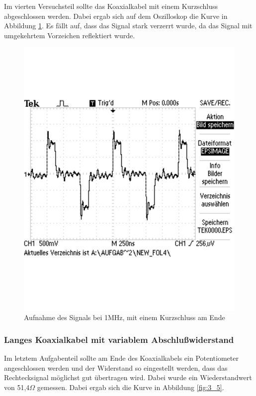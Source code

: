 \documentclass[12pt,a4paper]{article}
\begin{document}
Im vierten Versuchsteil sollte das Koaxialkabel mit einem Kurzschluss abgeschlossen werden. Dabei ergab sich auf dem Oszilloskop die Kurve in Abbildung \ref{fig:3_4}. Es fällt auf, dass das Signal stark verzerrt wurde, da das Signal mit umgekehrtem Vorzeichen reflektiert wurde.

\begin{figure}[H] 
  \centering
    \includegraphics[scale = 0.5]{3_4.pdf}
  	\caption[Aufnahme des Signals bei 1MHz, mit einem Kurzschluss am Ende]{Aufnahme des Signals bei 1MHz, mit einem Kurzschluss am Ende}
  \label{fig:3_4}
\end{figure}

\subsubsection{Langes Koaxialkabel mit variablem Abschlußwiderstand}

Im letztem Aufgabenteil sollte am Ende des Koaxialkabels ein Potentiometer angeschlossen werden und der Widerstand so eingestellt werden, dass das Rechtecksignal möglichst gut übertragen wird. Dabei wurde ein Wiederstandwert von 51,4$\Omega$ gemessen. Dabei ergab sich die Kurve in Abbildung \ref{fig:3_5}.
\end{document}
